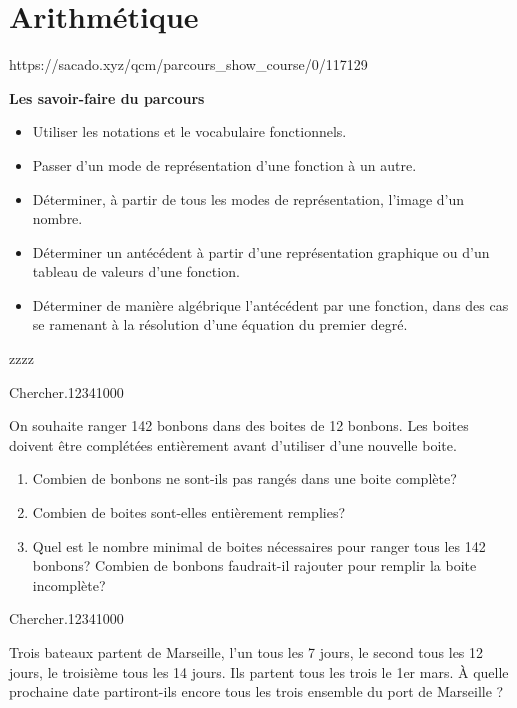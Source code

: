 \chapter{Arithmétique}
{https://sacado.xyz/qcm/parcours_show_course/0/117129}
{
 \begin{CpsCol}
\textbf{Les savoir-faire du parcours}
 \begin{itemize}
 \item Utiliser les notations et le vocabulaire fonctionnels.
 \item Passer d'un mode de représentation d'une fonction à un autre.
 \item Déterminer, à partir de tous les modes de représentation, l'image d'un nombre.
 \item Déterminer un antécédent à partir d'une représentation graphique ou d'un tableau de valeurs d'une fonction.
 \item Déterminer de manière algébrique l'antécédent par une fonction, dans des cas se ramenant à la résolution d'une équation du premier degré.
 \end{itemize}
 
 \end{CpsCol}
 
 \begin{His}
 zzzz
 \end{His}

\begin{ExoDec}{Chercher.}{1234}{1}{0}{0}{0}

 On souhaite ranger 142 bonbons dans des boites de 12 bonbons. Les boites doivent être complétées entièrement avant
d'utiliser d'une nouvelle boite.
\begin{enumerate}
\item Combien de bonbons ne sont-ils pas rangés dans une boite complète?
\item Combien de boites sont-elles entièrement remplies?
\item Quel est le nombre minimal de boites nécessaires pour ranger tous les 142 bonbons? Combien de bonbons faudrait-il
rajouter pour remplir la boite incomplète?
\end{enumerate}

\end{ExoDec}
 
 
\begin{ExoDec}{Chercher.}{1234}{1}{0}{0}{0}

Trois bateaux partent de Marseille, l'un tous les 7 jours, le second tous les 12 jours, le troisième tous les 14 jours. Ils partent
tous les trois le 1er mars. À quelle prochaine date partiront-ils encore tous les trois ensemble du port de Marseille ?



\end{ExoDec} 
 
 
}


